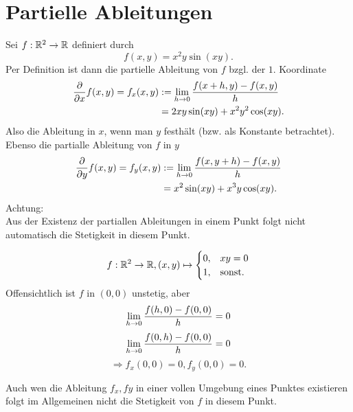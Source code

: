 \documentclass[../ana2u.tex]{subfiles}
\begin{document}
\setcounter{section}{8}
\section{Partielle Ableitungen}
Sei \( f:\mathbb{R}^2\rightarrow \mathbb{R} \) definiert 
durch 
\[ f(x,y) = x^2 y \sin(xy). \]
Per Definition ist dann die partielle 
Ableitung von \(f\) bzgl. der \(1.\) Koordinate
\begin{align*}
    \frac{\partial}{\partial x} f(x,y) = f_x(x,y) 
    &:= \lim\limits_{h\rightarrow{}0} \frac{f(x+h,y) - f(x,y)}{h} \\
    &= 2xy \sin(xy) + x^2y^2 \cos(xy).
\end{align*}
Also die Ableitung in \(x\), wenn man \(y\)
festhält (bzw. als Konstante betrachtet). \\
Ebenso die partialle Ableitung von \(f\) in \(y\)
\begin{align*}
    \frac{\partial}{\partial y} f(x,y) = f_y(x,y) 
    &:= \lim\limits_{h\rightarrow{}0} \frac{f(x,y+h) - f(x,y)}{h} \\
    &= x^2\sin(xy) + x^3y \cos (xy).
\end{align*}
Achtung: \\
Aus der Existenz der partiallen Ableitungen
in einem Punkt folgt nicht automatisch die 
Stetigkeit in diesem Punkt.
\begin{bsp}
    \[ f:\mathbb{R}^2\rightarrow \mathbb{R}, (x,y) \mapsto \begin{cases}
        0, &xy = 0\\
        1, &\text{sonst.}
    \end{cases} \]
    Offensichtlich ist \( f \) in \( (0,0) \) 
    unstetig, aber 
    \[ \lim\limits_{h\rightarrow{}0} \frac{f(h,0) - f(0,0)}{h} = 0 \]
    \[ \lim\limits_{h\rightarrow{}0} \frac{f(0,h) - f(0,0)}{h} = 0 \]
    \[ \Rightarrow f_x(0,0) = 0, f_y(0,0) = 0. \]    
\end{bsp}
Auch wen die Ableitung \(f_x, fy\) in einer vollen
Umgebung eines Punktes existieren folgt im 
Allgemeinen nicht die Stetigkeit von \(f\) in diesem
Punkt.
\end{document}

